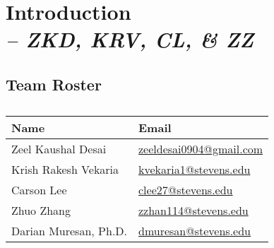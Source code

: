 \chapter{Introduction \\
\small{\textit{-- ZKD, KRV, CL, \& ZZ}}
\label{Chapter::Introduction}}

\section{Team Roster}

\begin{longtable}{|p{6cm}|p{6cm}|}
\caption{  \label{Table::TeamRoster}}\\
    
    \hline
    \textbf{Name} & \textbf{Email} \\
    \hline 
    \endhead

Zeel Kaushal Desai & \href{mailto:zeeldesai0904@gmail.com}{zeeldesai0904@gmail.com} \\ \hline

Krish Rakesh Vekaria & 
\href{mailto:kvekaria1@stevens.edu}{kvekaria1@stevens.edu} \\ \hline

Carson Lee & \href{mailto:clee27@stevens.edu}{clee27@stevens.edu} \\ \hline

Zhuo Zhang &
\href{mailto:zzhan114@stevens.edu}{zzhan114@stevens.edu} \\ \hline

Darian Muresan, Ph.D. & \href{mailto:dmuresan@stevens.edu}{dmuresan@stevens.edu} \\ \hline

\end{longtable}

    



